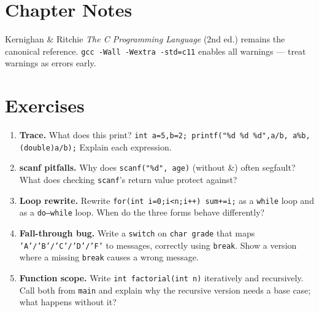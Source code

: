 \section{Chapter Notes}
Kernighan \& Ritchie \emph{The C Programming Language} (2nd ed.) remains the canonical reference. \texttt{gcc -Wall -Wextra -std=c11} enables all warnings --- treat warnings as errors early.

\section{Exercises}
\begin{enumerate}[label=E1.\arabic*, leftmargin=*, itemsep=0.6em]
\item \textbf{Trace.} What does this print? \texttt{int a=5,b=2; printf("\%d \%d \%d",a/b, a\%b, (double)a/b);} Explain each expression.
\item \textbf{scanf pitfalls.} Why does \texttt{scanf("\%d", age)} (without \&) often segfault? What does checking \texttt{scanf}'s return value protect against?
\item \textbf{Loop rewrite.} Rewrite \texttt{for(int i=0;i<n;i++) sum+=i;} as a \texttt{while} loop and as a \texttt{do--while} loop. When do the three forms behave differently?
\item \textbf{Fall-through bug.} Write a \texttt{switch} on \texttt{char grade} that maps \texttt{'A'/'B'/'C'/'D'/'F'} to messages, correctly using \texttt{break}. Show a version where a missing \texttt{break} causes a wrong message.
\item \textbf{Function scope.} Write \texttt{int factorial(int n)} iteratively and recursively. Call both from \texttt{main} and explain why the recursive version needs a base case; what happens without it?
\end{enumerate}
